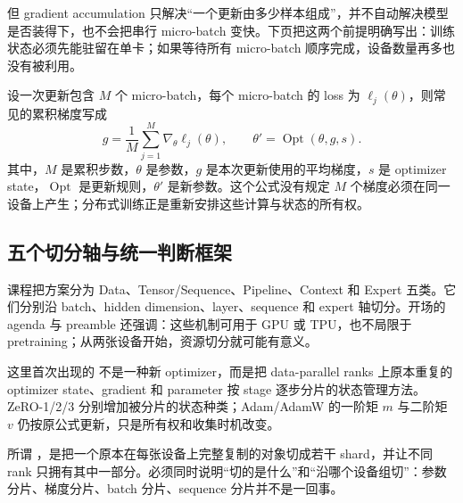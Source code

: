
但 gradient accumulation 只解决“一个更新由多少样本组成”，并不自动解决模型是否装得下，也不会把串行 micro-batch 变快。下页把这两个前提明确写出：训练状态必须先能驻留在单卡；如果等待所有 micro-batch 顺序完成，设备数量再多也没有被利用。


设一次更新包含 $M$ 个 micro-batch，每个 micro-batch 的 loss 为 $\ell_j(\theta)$，则常见的累积梯度写成
\[
g=\frac{1}{M}\sum_{j=1}^{M}\nabla_\theta \ell_j(\theta),
\qquad
\theta' = \operatorname{Opt}(\theta,g,s).
\]
其中，$M$ 是累积步数，$\theta$ 是参数，$g$ 是本次更新使用的平均梯度，$s$ 是 optimizer state，$\operatorname{Opt}$ 是更新规则，$\theta'$ 是新参数。这个公式没有规定 $M$ 个梯度必须在同一设备上产生；分布式训练正是重新安排这些计算与状态的所有权。

\subsection{五个切分轴与统一判断框架}

课程把方案分为 Data、Tensor/Sequence、Pipeline、Context 和 Expert 五类。它们分别沿 batch、hidden dimension、layer、sequence 和 expert 轴切分。开场的 agenda 与 preamble 还强调：这些机制可用于 GPU 或 TPU，也不局限于 pretraining；从两张设备开始，资源切分就可能有意义。


这里首次出现的 不是一种新 optimizer，而是把 data-parallel ranks 上原本重复的 optimizer state、gradient 和 parameter 按 stage 逐步分片的状态管理方法。ZeRO-1/2/3 分别增加被分片的状态种类；Adam/AdamW 的一阶矩 $m$ 与二阶矩 $v$ 仍按原公式更新，只是所有权和收集时机改变。


所谓 ，是把一个原本在每张设备上完整复制的对象切成若干 shard，并让不同 rank 只拥有其中一部分。必须同时说明“切的是什么”和“沿哪个设备组切”：参数分片、梯度分片、batch 分片、sequence 分片并不是一回事。


